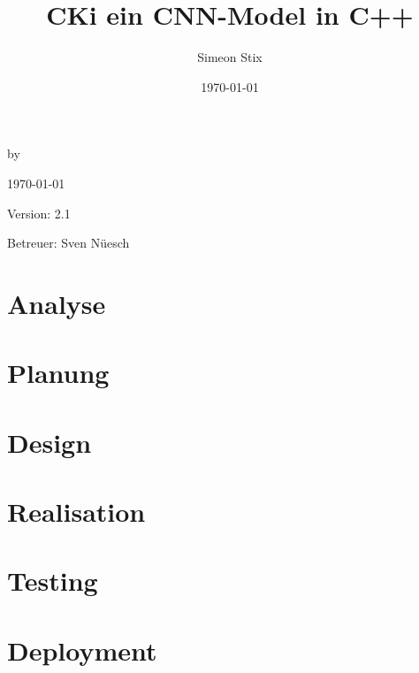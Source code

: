 \documentclass[a4paper,oneside,12pt]{report}
\title{CKi ein CNN-Model in C++}
\author{Simeon Stix}
\date{\today}
\renewcommand{\maketitle}{
\begin{titlepage}
    \begin{center}
        \vspace*{1cm}
        
        \Huge
        \textbf{\thetitle}
        
        \vspace{0.5cm}
        \Large
        by \theauthor
        
        \vspace{1.5cm}
        
        \today
        
        \vfill
        
        Version: 2.1
        
        \vspace{1cm}
        
        Betreuer: Sven Nüesch
        
    \end{center}
\end{titlepage}
}
\begin{document}
\maketitle

\pagestyle{plain} %

\tableofcontents %
\setcounter{secnumdepth}{4} %
\setcounter{tocdepth}{3} %

\chapter{Analyse}
\label{sec:Analyse}


\chapter{Planung}
\label{sec:Planung}


\chapter{Design}
\label{sec:Design}


\chapter{Realisation}
\label{sec:Realisation}


\chapter{Testing}
\label{sec:Testing}


\chapter{Deployment}
\label{sec:Deployment}



\clearpage
{}
\nocite{*} %
\end{document}
